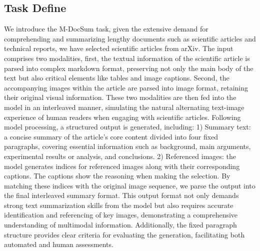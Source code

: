 \subsection{Task Define}
We introduce the M-DocSum task, given the extensive demand for comprehending and summarizing lengthy documents such as scientific articles and technical reports, we have selected scientific articles from arXiv.
The input comprises two modalities, first, the textual information of the scientific article is parsed into complex markdown format, preserving not only the main body of the text but also critical elements like tables and image captions. 
Second, the accompanying images within the article are parsed into image format, retaining their original visual information. 
These two modalities are then fed into the model in an interleaved manner, simulating the natural alternating text-image experience of human readers when engaging with scientific articles. 
Following model processing, a structured output is generated, including: 1) Summary text: a concise summary of the article's core content divided into four fixed paragraphs, covering essential information such as background, main arguments, experimental results or analysis, and conclusions. 
2) Referenced images: the model generates indices for referenced images along with their corresponding captions. The captions show the reasoning when making the selection.
By matching these indices with the original image sequence, we parse the output into the final interleaved summary format. 
This output format not only demands strong text summarization skills from the model but also requires accurate identification and referencing of key images, demonstrating a comprehensive understanding of multimodal information. 
Additionally, the fixed paragraph structure provides clear criteria for evaluating the generation, facilitating both automated and human assessments.


